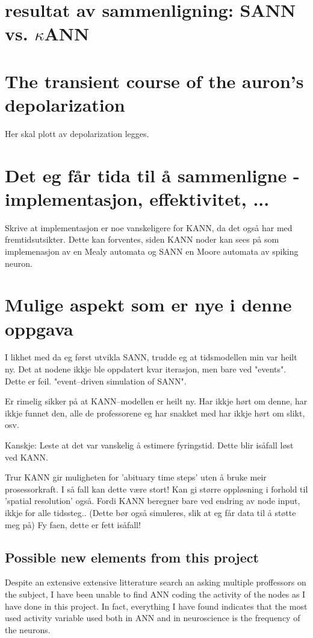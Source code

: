 \section{resultat av sammenligning: SANN vs. $\kappa$ANN}
	\section{ The transient course of the auron's depolarization }
	Her skal plott av depolarization legges.

	\section{ Det eg får tida til å sammenligne - implementasjon, effektivitet, ...}
	Skrive at implementasjon er noe vanskeligere for KANN, da det også har med fremtidsutsikter. Dette kan forventes, siden KANN noder kan sees på som implemenasjon av en Mealy automata og SANN en Moore automata av spiking neuron.

	\section{ Mulige aspekt som er nye i denne oppgava }
	I likhet med da eg først utvikla SANN, trudde eg at tidsmodellen min var heilt ny. Det at nodene ikkje ble oppdatert kvar iterasjon, men bare ved "events". Dette er feil. "event--driven simulation of SANN".
	
	Er rimelig sikker på at KANN--modellen er heilt ny. Har ikkje hørt om denne, har ikkje funnet den, alle de professorene eg har snakket med har ikkje hørt om slikt, osv.
	
	Kanskje: Leste at det var vanskelig å estimere fyringstid. Dette blir isåfall løst ved KANN.

	Trur KANN gir muligheten for 'abituary time steps' uten å bruke meir prosessorkraft. I så fall kan dette være stort! Kan gi større oppløsning i forhold til 'spatial resolution' også.
	Fordi KANN beregner bare ved endring av node input, ikkje for alle tidssteg..
	(Dette bør også simuleres, slik at eg får data til å støtte meg på)  	Fy faen, dette er fett isåfall!


	\subsection{Possible new elements from this project}
	Despite an extensive extensive litterature search an asking multiple proffessors on the subject, I have been unable to find ANN coding the activity of the nodes as I have done in this project.
	In fact, everything I have found indicates that the most used activity variable used both in ANN and in neuroscience is the frequency of the neurons.
	
